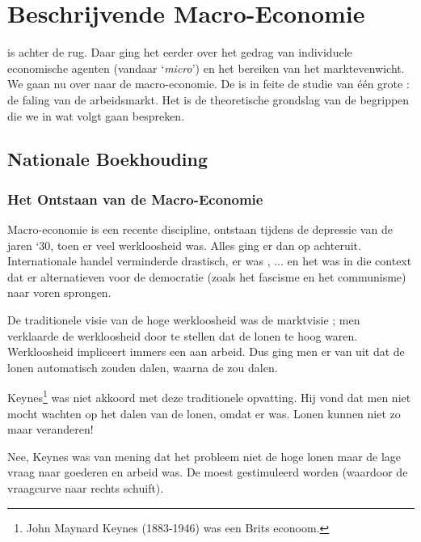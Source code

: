 \section{Beschrijvende Macro-Economie}

 is achter de rug. Daar ging het eerder over het gedrag van individuele economische agenten (vandaar `\textit{micro}') en het bereiken van het marktevenwicht. We gaan nu over naar de macro-economie. De  is in feite de studie van \'e\'en grote  : de faling van de arbeidsmarkt. Het is de theoretische grondslag van de begrippen die we in wat volgt gaan bespreken.

\subsection{Nationale Boekhouding}

\subsubsection{Het Ontstaan van de Macro-Economie}

Macro-economie is een recente discipline, ontstaan tijdens de depressie van de jaren `30, toen er veel werkloosheid was. Alles ging er dan op achteruit. Internationale handel verminderde drastisch, er was , ... en het was in die context dat er alternatieven voor de democratie (zoals het fascisme en het communisme) naar voren sprongen.\\

\par De traditionele visie van de hoge werkloosheid was de marktvisie ; men verklaarde de werkloosheid door te stellen dat de lonen te hoog waren. Werkloosheid impliceert immers een  aan arbeid. Dus ging men er van uit dat de lonen automatisch zouden dalen, waarna de  zou dalen.\\

\par Keynes\footnote{John Maynard Keynes (1883-1946) was een Brits econoom.} was niet akkoord met deze traditionele opvatting. Hij vond dat men niet mocht wachten op het dalen van de lonen, omdat er  was. Lonen kunnen niet zo maar veranderen!
\par Nee, Keynes was van mening dat het probleem niet de hoge lonen maar de lage vraag naar goederen en arbeid was. De  moest gestimuleerd worden (waardoor de vraagcurve naar rechts schuift).\\

